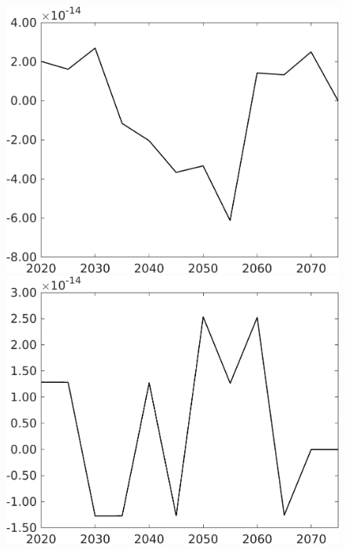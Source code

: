 \begin{figure}[h!!]
\begin{minipage}[]{0.32\textwidth}
\end{minipage}	
	\begin{minipage}[]{0.32\textwidth}
		\includegraphics[width=1\textwidth]{../../codding_model/own_basedOnFried/optimalPol_010922_revision/figures/all_13Sept22/CompTaul_Equlab_LFBAUPer_Reg0_GFF_spillover0_nsk1_xgr1_knspil0_sep1_countec0_GovRev1_etaa0.79.png}
	\end{minipage}	
\begin{minipage}[]{0.32\textwidth}
\includegraphics[width=1\textwidth]{../../codding_model/own_basedOnFried/optimalPol_010922_revision/figures/all_13Sept22/CompTaul_Equlab_LFBAUPer_Reg0_EY_spillover0_nsk1_xgr1_knspil0_sep1_countec0_GovRev1_etaa0.79.png}

\end{minipage}
\end{figure}
